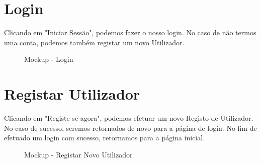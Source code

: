 \documentclass[a4paper,12pt]{scrreprt}
\newcommand{\tab}{
    \hspace{1cm}}
\begin{document}
\section{Login}

\tab Clicando em "Iniciar Sessão", podemos fazer o nosso login. No caso de não termos uma conta, podemos também registar um novo Utilizador.

\vspace{1cm}

\begin{figure}[hbt!]
    \centering
    \caption{Mockup - Login}
\end{figure}
\clearpage

\section{Registar Utilizador}

\tab Clicando em "Registe-se agora", podemos efetuar um novo Registo de Utilizador. No caso de sucesso, seremos retornados de novo para a página de login. No fim de efetuado um login com sucesso, retornamos para a página inicial.

\vspace{1cm}

\begin{figure}[hbt!]
    \centering
    \caption{Mockup - Registar Novo Utilizador}
\end{figure}
\clearpage
\end{document}
